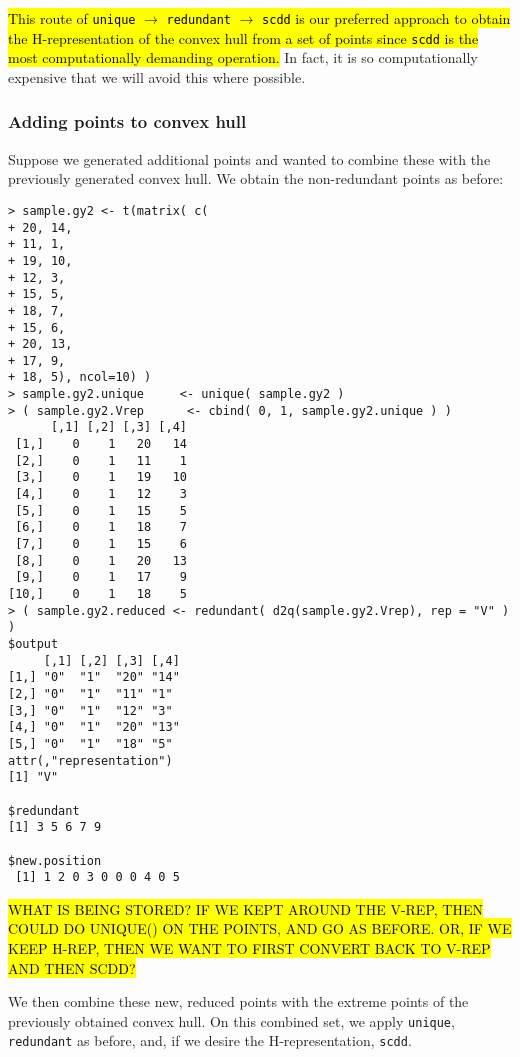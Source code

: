 \hl{This route of \texttt{unique} $\rightarrow$ \texttt{redundant} $\rightarrow$ 
\texttt{scdd} is our preferred approach to obtain the H-representation of the convex hull from a set of points since \texttt{scdd} is the most computationally demanding
operation.}  In fact, it is so computationally expensive that we will avoid
this where possible.

\subsubsection{Adding points to convex hull}
Suppose we generated additional points and wanted to combine these with the previously generated convex hull.  We obtain the non-redundant points as before:
\begin{verbatim}
> sample.gy2 <- t(matrix( c(
+ 20, 14,
+ 11, 1,
+ 19, 10,
+ 12, 3,
+ 15, 5,
+ 18, 7,
+ 15, 6,
+ 20, 13,
+ 17, 9,
+ 18, 5), ncol=10) ) 
> sample.gy2.unique 	<- unique( sample.gy2 ) 
> ( sample.gy2.Vrep 	 <- cbind( 0, 1, sample.gy2.unique ) )
      [,1] [,2] [,3] [,4]
 [1,]    0    1   20   14
 [2,]    0    1   11    1
 [3,]    0    1   19   10
 [4,]    0    1   12    3
 [5,]    0    1   15    5
 [6,]    0    1   18    7
 [7,]    0    1   15    6
 [8,]    0    1   20   13
 [9,]    0    1   17    9
[10,]    0    1   18    5
> ( sample.gy2.reduced <- redundant( d2q(sample.gy2.Vrep), rep = "V" ) )
$output
     [,1] [,2] [,3] [,4]
[1,] "0"  "1"  "20" "14"
[2,] "0"  "1"  "11" "1" 
[3,] "0"  "1"  "12" "3" 
[4,] "0"  "1"  "20" "13"
[5,] "0"  "1"  "18" "5" 
attr(,"representation")
[1] "V"

$redundant
[1] 3 5 6 7 9

$new.position
 [1] 1 2 0 3 0 0 0 4 0 5
\end{verbatim}
%
\hl{WHAT IS BEING STORED?  IF WE KEPT AROUND THE V-REP, THEN COULD
DO UNIQUE() ON THE POINTS, AND GO AS BEFORE.  OR, IF WE KEEP H-REP, THEN
WE WANT TO FIRST CONVERT BACK TO V-REP AND THEN SCDD?}

We then combine these new, reduced points with the extreme points of the previously
obtained convex hull.  On this combined set, we apply \texttt{unique}, 
\texttt{redundant} as before, and, if we desire the H-representation, \texttt{scdd}.

